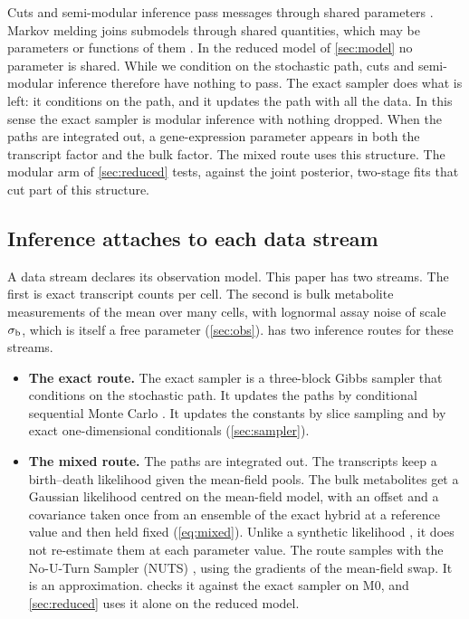 Cuts and semi-modular inference pass messages through shared parameters
\cite{plummer2015cuts,carmona2020semimodular}. Markov melding joins submodels through shared
quantities, which may be parameters or functions of them \cite{goudie2019joining}. In the reduced
model of \cref{sec:model} no parameter is shared. While we condition on the stochastic path,
cuts and semi-modular inference therefore have nothing to pass. The
exact sampler does what is left: it conditions on the path, and it updates the path
with all the data. In this sense the exact sampler is modular inference with nothing
dropped. When the paths are integrated out, a gene-expression parameter appears in
both the transcript factor and the bulk factor. The mixed route uses this
structure. The modular arm of \cref{sec:reduced} tests, against the joint posterior,
two-stage fits that cut part of this structure.

\subsection{Inference attaches to each data stream}
\label{sec:api}

A data stream declares its observation model. This paper has two streams. The first is
exact transcript counts per cell. The second is bulk metabolite measurements of the mean over
many cells, with lognormal assay noise of scale $\sigma_{\mathrm{b}}$, which is itself a free parameter
(\cref{sec:obs}). \IC{} has two inference routes for these streams.

\begin{itemize}
  \item \textbf{The exact route.} The exact sampler is a three-block Gibbs sampler that
  conditions on the stochastic path. It updates the paths by conditional sequential Monte
  Carlo \cite{andrieu2010particle}. It updates the constants by slice sampling and by exact
  one-dimensional conditionals (\cref{sec:sampler}).
  \item \textbf{The mixed route.} The paths are integrated out. The transcripts keep a
  birth--death likelihood given the mean-field pools. The bulk metabolites get a Gaussian
  likelihood centred on the mean-field model, with an offset and a covariance taken once
  from an ensemble of the exact hybrid at a reference value and then held fixed
  (\cref{eq:mixed}). Unlike a synthetic likelihood \cite{wood2010statistical,price2018bayesian},
  it does not re-estimate them at each parameter value. The route samples with the
  No-U-Turn Sampler (NUTS) \cite{hoffman2014nouturn}, using the gradients of the mean-field
  swap. It is an
  approximation.  checks
  it against the exact sampler on M0, and \cref{sec:reduced} uses it alone on the reduced
  model.
\end{itemize}

